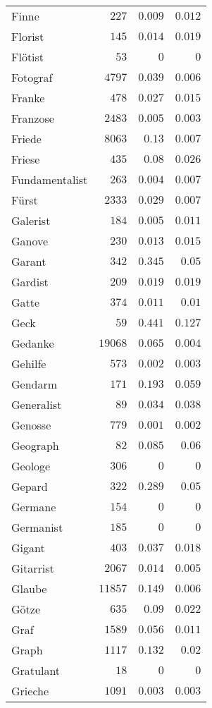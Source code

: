 \begin{supertabular}{lrrr}
Finne & $227$ & $0.009$ & $0.012$ \\
Florist & $145$ & $0.014$ & $0.019$ \\
Flötist & $53$ & $0$ & $0$ \\
Fotograf & $4797$ & $0.039$ & $0.006$ \\
Franke & $478$ & $0.027$ & $0.015$ \\
Franzose & $2483$ & $0.005$ & $0.003$ \\
Friede & $8063$ & $0.13$ & $0.007$ \\
Friese & $435$ & $0.08$ & $0.026$ \\
Fundamentalist & $263$ & $0.004$ & $0.007$ \\
Fürst & $2333$ & $0.029$ & $0.007$ \\
Galerist & $184$ & $0.005$ & $0.011$ \\
Ganove & $230$ & $0.013$ & $0.015$ \\
Garant & $342$ & $0.345$ & $0.05$ \\
Gardist & $209$ & $0.019$ & $0.019$ \\
Gatte & $374$ & $0.011$ & $0.01$ \\
Geck & $59$ & $0.441$ & $0.127$ \\
Gedanke & $19068$ & $0.065$ & $0.004$ \\
Gehilfe & $573$ & $0.002$ & $0.003$ \\
Gendarm & $171$ & $0.193$ & $0.059$ \\
Generalist & $89$ & $0.034$ & $0.038$ \\
Genosse & $779$ & $0.001$ & $0.002$ \\
Geograph & $82$ & $0.085$ & $0.06$ \\
Geologe & $306$ & $0$ & $0$ \\
Gepard & $322$ & $0.289$ & $0.05$ \\
Germane & $154$ & $0$ & $0$ \\
Germanist & $185$ & $0$ & $0$ \\
Gigant & $403$ & $0.037$ & $0.018$ \\
Gitarrist & $2067$ & $0.014$ & $0.005$ \\
Glaube & $11857$ & $0.149$ & $0.006$ \\
Götze & $635$ & $0.09$ & $0.022$ \\
Graf & $1589$ & $0.056$ & $0.011$ \\
Graph & $1117$ & $0.132$ & $0.02$ \\
Gratulant & $18$ & $0$ & $0$ \\
Grieche & $1091$ & $0.003$ & $0.003$ \\

\end{supertabular}
